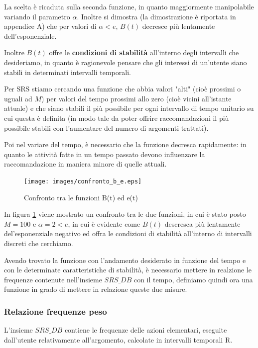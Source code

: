 {La scelta è ricaduta sulla seconda funzione, in quanto maggiormente manipolabile variando il parametro $\alpha$.
Inoltre si dimostra (la dimostrazione è riportata in appendice A) che per valori di $\alpha < e$, $B(t)$ decresce più lentamente dell'esponenziale.

Inoltre $B(t)$ offre le \textbf{condizioni di stabilità} all'interno degli intervalli che desideriamo, in quanto è ragionevole pensare che gli interessi di un'utente siano stabili in determinati intervalli temporali.

Per SRS stiamo cercando una funzione che abbia valori "alti" (cioè prossimi o uguali ad $M$) per valori del tempo prossimi allo zero (cioè vicini all'istante attuale) e che siano stabili il più possibile per ogni intervallo di tempo unitario su cui questa è definita (in modo tale da poter offrire raccomandazioni il più possibile stabili con l'aumentare del numero di argomenti trattati).

Poi nel variare del tempo, è necessario che la funzione decresca rapidamente: in quanto le attività fatte in un tempo passato devono influenzare la raccomandazione in maniera minore di quelle attuali.

\begin{figure}[H]
    \begin{center}
        \texttt{[image: images/confronto\_b\_e.eps]}
        \caption{Confronto tra le funzioni B(t) ed e(t)}
        \label{fig:confronto_b_e}
    \end{center}
\end{figure}

In figura \ref{fig:confronto_b_e} viene mostrato un confronto tra le due funzioni, in cui è stato posto $M = 100$ e $\alpha = 2 < e$, in cui è evidente come $B(t)$ descresca più lentamente del'esponenziale negativo ed offra le condizioni di stabilità all'interno di intervalli discreti che cerchiamo.

Avendo trovato la funzione con l'andamento desiderato in funzione del tempo e con le determinate caratteristiche di stabilità, è necessario mettere in realzione le frequenze contenute nell'insieme $SRS\_DB$ con il tempo, definiamo quindi ora una funzione in grado di mettere in relazione queste due misure.

\subsubsection{Relazione frequenze peso}
L'insieme $SRS\_DB$ contiene le frequenze delle azioni elementari, eseguite dall'utente relativamente all'argomento, calcolate in intervalli temporali R.

}
